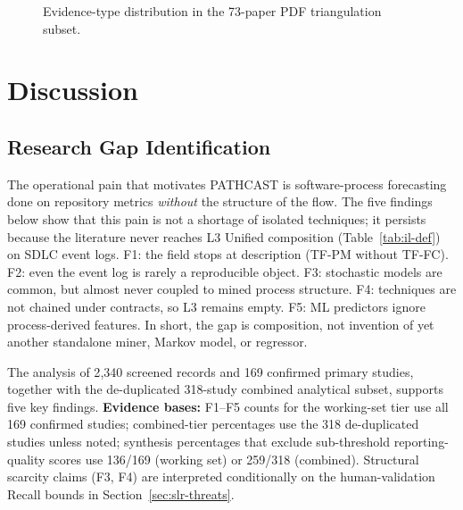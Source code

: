 \begin{figure}[tbp]
\centering
{}
\caption{Evidence-type distribution in the 73-paper PDF triangulation subset.}
\label{fig:pdf-evidence-dist}
\end{figure}


\section{Discussion}
\label{sec:slr-discussion}

\subsection{Research Gap Identification}
\label{sec:slr-gaps}

The operational pain that motivates PATHCAST is software-process forecasting
done on repository metrics \emph{without} the structure of the flow. The five
findings below show that this pain is not a shortage of isolated techniques;
it persists because the literature never reaches L3 Unified composition
(Table~\ref{tab:il-def}) on SDLC event logs. F1: the field stops at
description (TF-PM without TF-FC). F2: even the event log is rarely a
reproducible object. F3: stochastic models are common, but almost never
coupled to mined process structure. F4: techniques are not chained under
contracts, so L3 remains empty. F5: ML predictors ignore process-derived
features. In short, the gap is composition, not invention of yet another
standalone miner, Markov model, or regressor.

The analysis of 2{,}340 screened records and 169 confirmed primary studies,
together with the de-duplicated 318-study combined analytical subset, supports
five key findings.
\textbf{Evidence bases:} F1--F5 counts for the working-set tier use all 169
confirmed studies; combined-tier percentages use the 318 de-duplicated studies
unless noted; synthesis percentages that exclude sub-threshold reporting-quality
scores use 136/169 (working set) or 259/318 (combined). Structural scarcity
claims (F3, F4) are interpreted conditionally on the human-validation Recall
bounds in Section~\ref{sec:slr-threats}.

